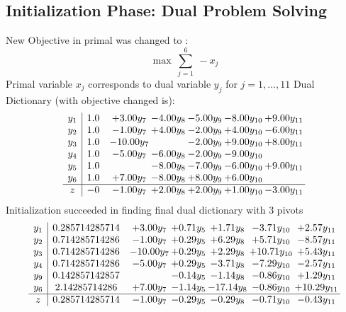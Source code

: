 \documentclass[8pt]{article}
\begin{document}
\subsection{Initialization Phase: Dual Problem Solving}
New Objective in primal was changed to : \[ \max\ \sum_{j=1}^{6}\ - x_j \] 
Primal variable $x_j$ corresponds to dual variable $y_j$ for $j = 1,\ldots,11$
Dual Dictionary (with objective changed is): 
\[\begin{array}{c| c c@{\hskip 2pt} c@{\hskip 2pt} c@{\hskip 2pt} c@{\hskip 2pt} c@{\hskip 2pt} }
 y_{1}   &  1.0 & +  3.00 y_{7} & -4.00 y_{8} & -5.00 y_{9} & -8.00 y_{10} & +  9.00 y_{11}\\
 y_{2}   &  1.0 & -1.00 y_{7} & +  4.00 y_{8} & -2.00 y_{9} & +  4.00 y_{10} & -6.00 y_{11}\\
 y_{3}   &  1.0 & -10.00 y_{7} &   & -2.00 y_{9} & +  9.00 y_{10} & +  8.00 y_{11}\\
 y_{4}   &  1.0 & -5.00 y_{7} & -6.00 y_{8} & -2.00 y_{9} & -9.00 y_{10} &   \\
 y_{5}   &  1.0  &   & -8.00 y_{8} & -7.00 y_{9} & -6.00 y_{10} & +  9.00 y_{11}\\
 y_{6}   &  1.0 & +  7.00 y_{7} & -8.00 y_{8} & +  8.00 y_{9} & +  6.00 y_{10} &   \\
\hline
z    &  -0 & -1.00 y_{7} & +  2.00 y_{8} & +  2.00 y_{9} & +  1.00 y_{10} & -3.00 y_{11}\\
\end{array}\]
Initialization succeeded in finding final dual dictionary with 3 pivots
\[\begin{array}{c| c c@{\hskip 2pt} c@{\hskip 2pt} c@{\hskip 2pt} c@{\hskip 2pt} c@{\hskip 2pt} }
 y_{1}   &  0.285714285714 & +  3.00 y_{7} & +  0.71 y_{5} & +  1.71 y_{8} & -3.71 y_{10} & +  2.57 y_{11}\\
 y_{2}   &  0.714285714286 & -1.00 y_{7} & +  0.29 y_{5} & +  6.29 y_{8} & +  5.71 y_{10} & -8.57 y_{11}\\
 y_{3}   &  0.714285714286 & -10.00 y_{7} & +  0.29 y_{5} & +  2.29 y_{8} & + 10.71 y_{10} & +  5.43 y_{11}\\
 y_{4}   &  0.714285714286 & -5.00 y_{7} & +  0.29 y_{5} & -3.71 y_{8} & -7.29 y_{10} & -2.57 y_{11}\\
 y_{9}   &  0.142857142857  &   & -0.14 y_{5} & -1.14 y_{8} & -0.86 y_{10} & +  1.29 y_{11}\\
 y_{6}   &  2.14285714286 & +  7.00 y_{7} & -1.14 y_{5} & -17.14 y_{8} & -0.86 y_{10} & + 10.29 y_{11}\\
\hline
z    &  0.285714285714 & -1.00 y_{7} & -0.29 y_{5} & -0.29 y_{8} & -0.71 y_{10} & -0.43 y_{11}\\
\end{array}\]
\end{document}
